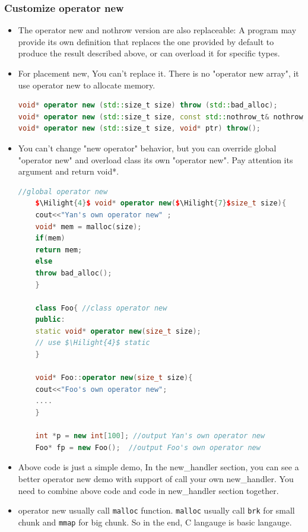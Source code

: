 \documentclass[a4paper,12pt,twoside]{book}
\newcommand{\Hilight}[1]{\makebox[0pt][l]{\color{yellow}\rule[-3pt]{#1em}{11pt}}}
\begin{document}
\subsubsection{Customize operator new}
\begin{itemize}
	\item The operator new and nothrow version are also replaceable: A program may provide its own definition that replaces the one provided by default to produce the result described above, or can overload it for specific types. 
	\item For placement new, You can't replace it. There is no "operator new array", it use operator new to allocate memory. 
\begin{lstlisting}[frame=single, language=c++]
void* operator new (std::size_t size) throw (std::bad_alloc);
void* operator new (std::size_t size, const std::nothrow_t& nothrow_value) throw();
void* operator new (std::size_t size, void* ptr) throw();
\end{lstlisting}
	
	\item You can't change "new operator" behavior, but you can override global "operator new" and overload class its own "operator new". Pay attention its argument and return void*. 
	
	\begin{lstlisting}[frame=single, language=c++, mathescape=true]
	//global operator new
	$\Hilight{4}$ void* operator new($\Hilight{7}$size_t size){
	cout<<"Yan's own operator new" ;
	void* mem = malloc(size);
	if(mem)
	return mem;
	else
	throw bad_alloc();
	}
	
	class Foo{ //class operator new
	public:
	static void* operator new(size_t size);
	// use $\Hilight{4}$ static
	}
	
	void* Foo::operator new(size_t size){
	cout<<"Foo's own operator new";
	....
	}
	
	int *p = new int[100]; //output Yan's own operator new
	Foo* fp = new Foo();  //output Foo's own operator new
	\end{lstlisting}
	
	\item Above code is just a simple demo, In the new\_handler section, you can see a better operator new demo with support of call your own new\_handler. You need to combine above code and code in new\_handler section together. 
	
	\item operator new usually call \texttt{malloc} function. \texttt{malloc} usually call \texttt{brk} for small chunk and \texttt{mmap} for big chunk. So in the end, C langauge is basic langauge.
	

\end{itemize}
\end{document}
